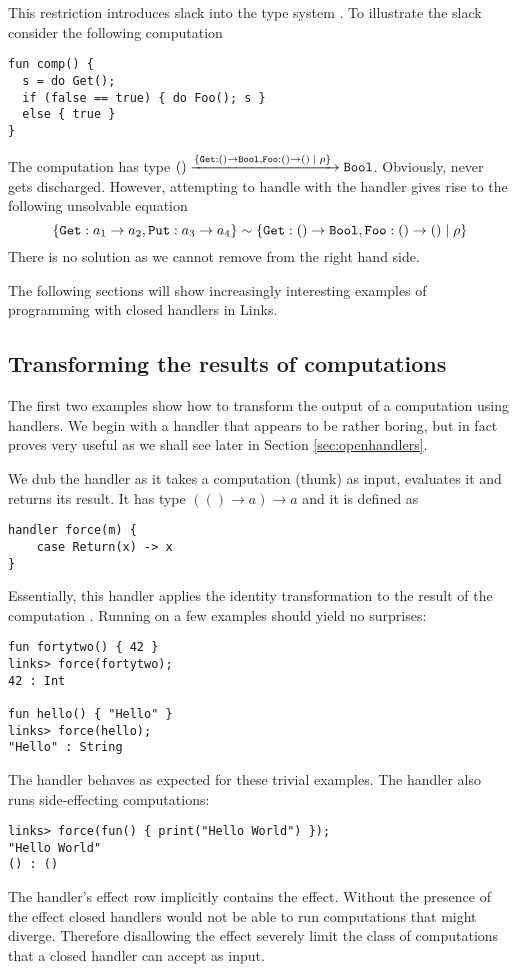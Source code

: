 This restriction introduces slack into the type system \cite{Huttel2010}. To illustrate the slack consider the following computation
\begin{lstlisting}[style=links]
fun comp() {
  s = do Get();
  if (false == true) { do Foo(); s }
  else { true }
}
\end{lstlisting}
The computation  has type $() \xrightarrow{ \{ \texttt{Get}:() \to \texttt{Bool},\texttt{Foo}:() \to () \; | \; \rho \}\;} \texttt{Bool}$. Obviously,  never gets discharged. However, attempting to handle  with the handler  gives rise to the following unsolvable equation 
\[ \{\texttt{Get}: a_1 \to a_2, \texttt{Put} : a_3 \to a_4 \} \sim \{\texttt{Get}:() \to \texttt{Bool},\texttt{Foo}:() \to () \; | \; \rho \}\]
There is no solution as we cannot remove  from the right hand side.

The following sections will show increasingly interesting examples of programming with closed handlers in Links.

\subsection{Transforming the results of computations}\label{sec:transform}
The first two examples show how to transform the output of a computation using handlers. We begin with a handler that appears to be rather boring, but in fact proves very useful as we shall see later in Section \ref{sec:openhandlers}.
\begin{example}\label{ex:force}
We dub the handler  as it takes a computation (thunk) as input, evaluates it and returns its result. It has type $(() \to a) \to a$ and it is defined as
\begin{lstlisting}[style=links]
handler force(m) {
    case Return(x) -> x
}
\end{lstlisting}
Essentially, this handler applies the identity transformation to the result of the computation . Running  on a few examples should yield no surprises:
\begin{lstlisting}[style=links]
fun fortytwo() { 42 }
links> force(fortytwo);
42 : Int

fun hello() { "Hello" }
links> force(hello);
"Hello" : String
\end{lstlisting}
The handler  behaves as expected for these trivial examples. The  handler also runs side-effecting computations:
\begin{lstlisting}[style=links]
links> force(fun() { print("Hello World") });
"Hello World"
() : ()
\end{lstlisting}
The  handler's effect row implicitly contains the  effect. Without the presence of the  effect closed handlers would not be able to run computations that might diverge. Therefore disallowing the  effect severely limit the class of computations that a closed handler can accept as input.
\end{example}

